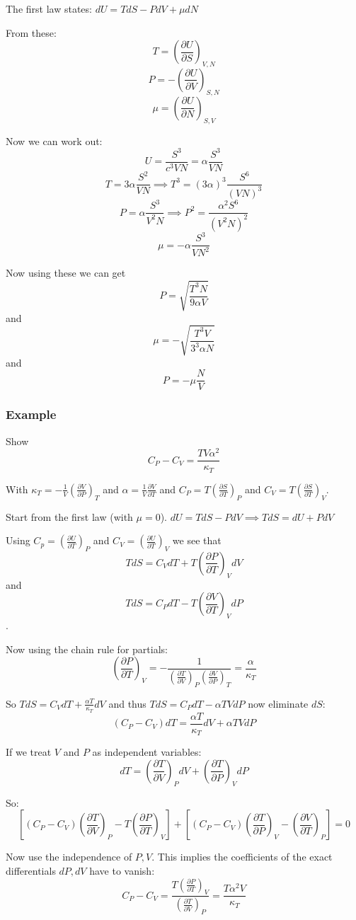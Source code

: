 \vspace{\baselineskip}

The first law states: $dU = TdS - PdV + \mu dN$

From these: $$T = \left(\frac{\partial U}{\partial S}\right)_{V,N}$$
$$P = - \left(\frac{\partial U}{\partial V}\right)_{S,N}$$
$$\mu = \left(\frac{\partial U}{\partial N}\right)_{S,V}$$

Now we can work out: $$U = \frac{S^3}{c^3 VN} = \alpha \frac{S^3}{VN}$$
$$T = 3 \alpha \frac{S^2}{VN} \implies T^3 = (3\alpha)^3 \frac{S^6}{(VN)^3}$$
$$P = \alpha \frac{S^3}{V^2 N} \implies P^2 = \frac{\alpha^2 S^6}{(V^2 N)^2}$$
$$\mu = - \alpha \frac{S^3}{VN^2}$$

Now using these we can get $$P = \sqrt{\frac{T^3N}{9 \alpha V}}$$ and $$\mu = - \sqrt{\frac{T^3 V}{3^3 \alpha N}}$$ and $$P = -\mu \frac{N}{V}$$

\subsubsection*{Example}

Show $$C_P - C_V = \frac{T V \alpha^2}{\kappa_T}$$

With $\kappa_T = - \frac{1}{V} \left(\frac{\partial V}{\partial P}\right)_T$ and $\alpha = \frac{1}{V} \frac{\partial V}{\partial T}$ and $C_P = T \left(\frac{\partial S}{\partial T}\right)_P$ and $C_V = T \left(\frac{\partial S}{\partial T}\right)_V$.

Start from the first law (with $\mu = 0$). $dU = TdS - PdV \implies TdS = dU + PdV$

Using $C_p = \left(\frac{\partial U}{\partial T}\right)_P$ and $C_V = \left(\frac{\partial U}{\partial T}\right)_V$ we see that $$TdS = C_V dT + T \left(\frac{\partial P}{\partial T}\right)_V dV$$ and $$TdS = C_P dT - T \left(\frac{\partial V}{\partial T}\right)_V dP$$.

Now using the chain rule for partials: $$\left(\frac{\partial P}{\partial T}\right)_V = - \frac{1}{\left(\frac{\partial T}{\partial V}\right)_P \left(\frac{\partial V}{\partial P}\right)_T} = \frac{\alpha}{\kappa_T}$$

So $TdS = C_V dT + \frac{\alpha T}{\kappa_T} dV$ and thus $TdS = C_P dT - \alpha TV dP$ now eliminate $dS$: $$(C_P - C_V) dT = \frac{\alpha T}{\kappa_T} dV + \alpha TV dP$$

If we treat $V$ and $P$ as independent variables: $$dT = \left(\frac{\partial T}{\partial V}\right)_P dV + \left(\frac{\partial T}{\partial P}\right)_V dP$$

So: $$\left[ (C_P - C_V) \left(\frac{\partial T}{\partial V}\right)_P - T \left(\frac{\partial P}{\partial T}\right)_V \right] + \left[(C_P - C_V) \left(\frac{\partial T}{\partial P}\right)_V - \left(\frac{\partial V}{\partial T}\right)_P \right] = 0$$

Now use the independence of $P,V$. This implies the coefficients of the exact differentials $dP, dV$ have to vanish: 
$$C_P - C_V = \frac{T \left(\frac{\partial P}{\partial T}\right)_V}{\left(\frac{\partial T}{\partial V}\right)_P} = \frac{T \alpha^2 V}{\kappa_T}$$